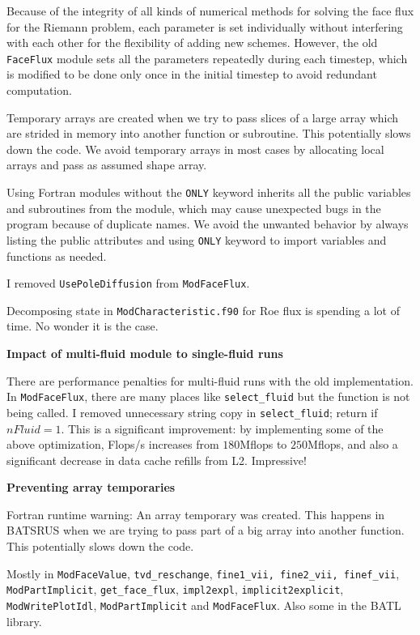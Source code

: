 \documentclass[11pt]{book} %
\begin{document}
Because of the integrity of all kinds of numerical methods for solving the face flux for the Riemann problem, each parameter is set individually without interfering with each other for the flexibility of adding new schemes. However, the old \verb|FaceFlux| module sets all the parameters repeatedly during each timestep, which is modified to be done only once in the initial timestep to avoid redundant computation.

Temporary arrays are created when we try to pass slices of a large array which are strided in memory into another function or subroutine. This potentially slows down the code. We avoid temporary arrays in most cases by allocating local arrays and pass as assumed shape array.

Using Fortran modules without the \verb|ONLY| keyword inherits all the public variables and subroutines from the module, which may cause unexpected bugs in the program because of duplicate names. We avoid the unwanted behavior by always listing the public attributes and using \verb|ONLY| keyword to import variables and functions as needed.

I removed \verb|UsePoleDiffusion| from \verb|ModFaceFlux|.

Decomposing state in \verb|ModCharacteristic.f90| for Roe flux is spending a lot of time. No wonder it is the case.

\textbf{Impact of multi-fluid module to single-fluid runs}

There are performance penalties for multi-fluid runs with the old implementation. In \verb|ModFaceFlux|, there are many places like \verb|select_fluid| but the function is not being called. I removed unnecessary string copy in \verb|select_fluid|;
 return if $nFluid = 1$. This is a significant improvement: by implementing some of the above optimization, Flops/s increases from $180$Mflops to $250$Mflops, and also a significant decrease in data cache refills from L2. Impressive!

\textbf{Preventing array temporaries}

Fortran runtime warning: An array temporary was created. This happens in BATSRUS when we are trying to pass part of a big array into another function. This potentially slows down the code.

Mostly in \verb|ModFaceValue|, \verb|tvd_reschange|, \verb|fine1_vii, fine2_vii, finef_vii|, \verb|ModPartImplicit|, \verb|get_face_flux|, \verb|impl2expl|, \verb|implicit2explicit|, \verb|ModWritePlotIdl|,  \verb|ModPartImplicit| and \verb|ModFaceFlux|. Also some in the BATL library.
\end{document}
